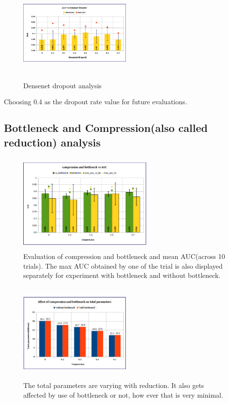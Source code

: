 \begin{figure}[h]
\centering
\includegraphics[height=5cm,width=0.5\textwidth]{images/densenet/auc_vs_densenet_dropout}
\caption{Densenet dropout analysis}
\label{fig:auc_vs_densenet_dropout}
\end{figure}
Choosing 0.4 as the dropout rate value for future evaluations.

\subsection{Bottleneck and Compression(also called reduction) analysis}

\begin{figure}[h]
\centering
\includegraphics[height=5cm,width=0.6\textwidth]{images/densenet/compression_and_bottleneck_vs_auc}
\caption{Evaluation of compression and bottleneck and mean AUC(across 10 trials). The max AUC obtained by one of the trial is also displayed separately for experiment with bottleneck and without bottleneck.}
\label{fig:compression_and_bottleneck_vs_auc}
\end{figure}

\begin{figure}[h]
\centering
\includegraphics[height=5cm,width=0.5\textwidth]{images/densenet/compression_and_bn_vs_parameters}
\caption{The total parameters are varying with reduction. It also gets affected by use of bottleneck or not, how ever that is very minimal.}
\label{fig:compression_and_bn_vs_parameters}
\end{figure}

